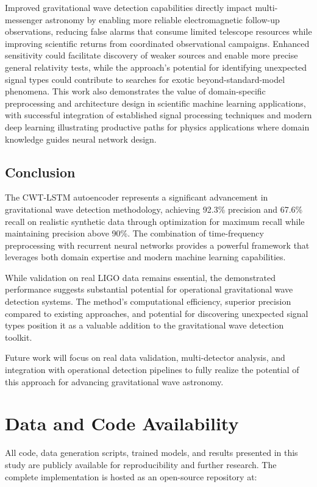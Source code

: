 \documentclass{iopjournal}
\begin{document}
Improved gravitational wave detection capabilities directly impact multi-messenger astronomy by enabling more reliable electromagnetic follow-up observations, reducing false alarms that consume limited telescope resources while improving scientific returns from coordinated observational campaigns. Enhanced sensitivity could facilitate discovery of weaker sources and enable more precise general relativity tests, while the approach's potential for identifying unexpected signal types could contribute to searches for exotic beyond-standard-model phenomena. This work also demonstrates the value of domain-specific preprocessing and architecture design in scientific machine learning applications, with successful integration of established signal processing techniques and modern deep learning illustrating productive paths for physics applications where domain knowledge guides neural network design.

\subsection{Conclusion}

The CWT-LSTM autoencoder represents a significant advancement in gravitational wave detection methodology, achieving 92.3\% precision and 67.6\% recall on realistic synthetic data through optimization for maximum recall while maintaining precision above 90\%. The combination of time-frequency preprocessing with recurrent neural networks provides a powerful framework that leverages both domain expertise and modern machine learning capabilities.

While validation on real LIGO data remains essential, the demonstrated performance suggests substantial potential for operational gravitational wave detection systems. The method's computational efficiency, superior precision compared to existing approaches, and potential for discovering unexpected signal types position it as a valuable addition to the gravitational wave detection toolkit.

Future work will focus on real data validation, multi-detector analysis, and integration with operational detection pipelines to fully realize the potential of this approach for advancing gravitational wave astronomy.

\section{Data and Code Availability}

All code, data generation scripts, trained models, and results presented in this study are publicly available for reproducibility and further research. The complete implementation is hosted as an open-source repository at:
\end{document}
